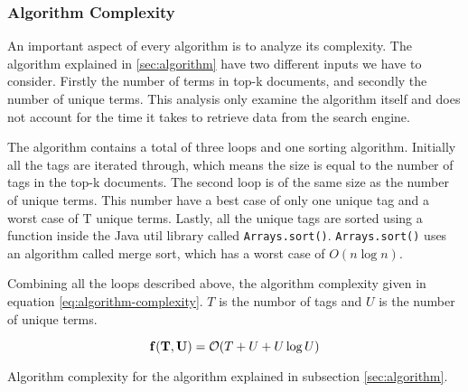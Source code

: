 \subsubsection{Algorithm Complexity}
An important aspect of every algorithm is to analyze its complexity.
The algorithm explained in \ref{sec:algorithm} have two different inputs we have to consider.
Firstly the number of terms in top-k documents, and secondly the number of unique terms.
This analysis only examine the algorithm itself and does not account for the time it takes to retrieve data from the search engine.

The algorithm contains a total of three loops and one sorting algorithm.
Initially all the tags are iterated through,
which means the size is equal to the number of tags in the top-k documents.
The second loop is of the same size as the number of unique terms.
This number have a best case of only one unique tag and a worst case of T unique terms.
Lastly, all the unique tags are sorted using a function inside the Java util library called \texttt{Arrays.sort()}.
\texttt{Arrays.sort()} uses an algorithm called merge sort,
which has a worst case of $O(n\log{}n)$.

Combining all the loops described above, the algorithm complexity  given in equation \ref{eq:algorithm-complexity}.
$T$ is the numbor of tags and $U$ is the number of unique terms.

\begin{cequation}[H]
	\begin{equation}
		\mathbf{ f(T, U) } = \mathcal{O}( T + U + U\log{}U ) \\
	\end{equation}
  \caption{Algorithm complexity for the algorithm explained in subsection \ref{sec:algorithm}.}
  \label{eq:algorithm-complexity}
\end{cequation}





